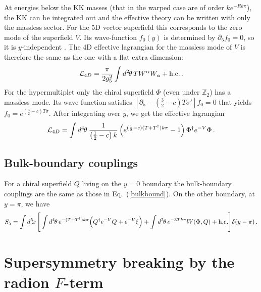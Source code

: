 \documentclass[a4paper,12pt]{article}
\newcommand{\Zparity}{\ensuremath{\mathbb{Z}_2}}
\begin{document}
At energies below the KK masses (that in the warped case are of order 
$ke^{-Rk\pi}$), the KK can be integrated out and 
the effective theory can be written with 
only the massless sector.
For  the 5D vector superfield this corresponds to the 
zero mode of the    superfield $V$.
Its wave-function $f_0(y)$ is determined by $\partial_5 f_0=0$, so
it is  $y$-independent \cite{gaugewarped}.  
The 4D effective lagrangian for 
the massless mode of $V$
is therefore the same as the one
with a flat extra dimension:
\begin{equation}
{\cal L}_{4D}=\frac{\pi}{2g^2_5} \int d^2\mspace{-2mu}\theta\, T
        W^{\alpha}W_{\alpha} + \text{h.c.}\, . 
\label{vector0}
\end{equation}
For the hypermultiplet
only the chiral superfield $\Phi$ (even under $\Zparity$)
has a massless  mode.
Its wave-function satisfies
$ [\partial_5-(\frac{3}{2} - c)T \sigma' ] f_0=0$
that yields
$
f_0=e^{(\frac{3}{2} - c ) T \sigma}
$.
After integrating over $y$, we get 
the effective lagrangian 
\begin{equation}
{\cal L}_{4D}= \int d^4\mspace{-2mu}\theta
    \: \frac{1}{\left(\frac{1}{2}-c\right)k}\left(
e^{(\frac{1}{2}-c)(T+T^\dagger)k\pi}-1\right) 
\Phi^\dagger e^{-V}\Phi\, .
\label{hyper0}
\end{equation}










\subsection{Bulk-boundary couplings}

For a chiral superfield $Q$ living on the $y=0$ boundary the
bulk-boundary couplings are the same as those in Eq.~(\ref{bulkbound}).
On the other boundary, at $y=\pi$, we have
\begin{equation}
S_5=\int d^{5}\! x\, 
\Bigg[\int d^4\mspace{-2mu}\theta\, e^{-(T+ T^\dagger)k\pi} 
\Big( Q^\dagger e^{-V} Q+e^{-V}\xi\Big) 
+\int d^2\mspace{-2mu}\theta\, e^{-3Tk\pi} 
W(\Phi,Q)+ \text{h.c.}
\Bigg]\delta(y-\pi)\, .
\label{boundtev}
\end{equation}



\section{Supersymmetry breaking by the radion $F$-term}
\end{document}
